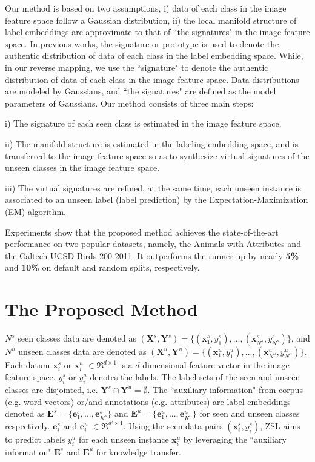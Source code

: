 \documentclass{article}
\begin{document}
Our method is based on two assumptions, i) data of each class in the image feature space follow a Gaussian distribution, ii) the local manifold structure of label embeddings are approximate to that of ``the signatures" in the image feature space. In previous works, the signature\cite{romera2015embarrassingly} or prototype\cite{fu2015transductive} is used to denote the authentic distribution of data of each class in the label embedding space. While, in our reverse mapping, we use the ``signature" to
denote the authentic distribution of data of each class in the image feature space. Data distributions are modeled by Gaussians, and ``the signatures" are defined as the model parameters of Gaussians. Our method consists of three main steps:

i) The signature of each seen class is estimated in the image feature space.

ii) The manifold structure is estimated in the labeling embedding space, and is transferred to the image feature space so as to synthesize virtual signatures of the unseen classes in the image feature space.

iii) The virtual signatures are refined, at the same time, each unseen instance is associated to an unseen label (label prediction) by the Expectation-Maximization (EM) algorithm.

Experiments show that the proposed method achieves the state-of-the-art performance on two popular datasets, namely, the Animals with Attributes and the Caltech-UCSD Birds-200-2011. It outperforms the runner-up by nearly \textbf{5\%} and \textbf{10\%} on default and random splits, respectively.

\section{The Proposed Method}


$N^s$ seen classes data are denoted as $(\bm{X}^s,\bm{Y}^s)=\{(\bm{x}^s_1,{y}^s_1),...,(\bm{x}^s_{N^s},{y}^s_{N^s})\}$, and $N^u$ unseen classes data are denoted as $(\bm{X}^u,\bm{Y}^u)=\{(\bm{x}^u_1,{y}^u_1),...,(\bm{x}^u_{N^u},{y}^u_{N^u})\}$.
Each datum $\bm{x}^s_{i}$ or $\bm{x}^u_{i}$ $\in \Re^{d \times 1}$ is a $d$-dimensional feature vector in the image feature space.
${y}^s_i$ or ${y}^u_i$ denotes the labels. The label sets of the seen and unseen classes are disjointed, i.e. $ \bm{Y}^s \cap \bm{Y}^u = \emptyset$. The ``auxiliary information" from corpus (e.g. word vectors) or/and annotations (e.g. attributes) are label embeddings denoted as $\bm{E}^s=\{\bm{e}^s_1,...,\bm{e}^s_{K^s}\}$ and $\bm{E}^u=\{\bm{e}^u_1,...,\bm{e}^u_{K^u}\}$ for seen and unseen classes respectively. $\bm{e}^s_{i}$ and $\bm{e}^u_{i}$ $\in \Re^{d' \times 1}$.
Using the seen data pairs $(\bm{x}^s_i,{y}^s_i)$, ZSL aims to predict labels ${y}^u_i$ for each unseen instance $\bm{x}^u_i$ by leveraging the ``auxiliary information" $\bm{E}^s$ and $\bm{E}^u$ for knowledge transfer.
\end{document}
